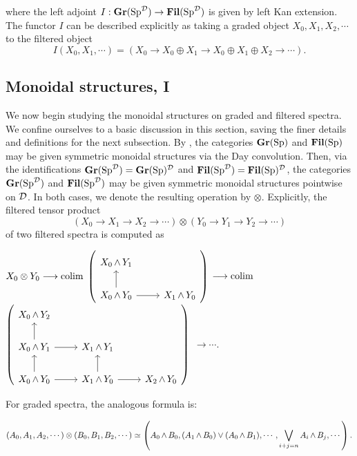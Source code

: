 where the left adjoint $I: \operatorname{\textbf{Gr}}(\operatorname{\text{Sp}}^{\operatorname{\mathcal{D}}}) \to \operatorname{\textbf{Fil}}(\operatorname{\text{Sp}}^{\operatorname{\mathcal{D}}})$ is given by left Kan extension.  The functor $I$ can be described explicitly as taking a graded object $X_0,X_1,X_2,\cdots$ to the filtered object $$I(X_0, X_1, \cdots) = (X_0\to X_0\oplus X_1\to X_0 \oplus X_1\oplus X_2\to \cdots).$$   


\subsection{Monoidal structures, I}\label{sect:monoidal}
We now begin studying the monoidal structures on graded and filtered spectra.  We confine ourselves to a basic discussion in this section, saving the finer details and definitions for the next subsection. 
By \cite[Example 2.2.6.17]{HA}, the categories $\operatorname{\textbf{Gr}}(\operatorname{\text{Sp}})$ and $\operatorname{\textbf{Fil}}(\operatorname{\text{Sp}})$ may be given symmetric monoidal structures via the Day convolution.  Then, via the identifications $\operatorname{\textbf{Gr}}(\operatorname{\text{Sp}}^{\operatorname{\mathcal{D}}}) = \operatorname{\textbf{Gr}}(\operatorname{\text{Sp}})^{\operatorname{\mathcal{D}}}$ and $\operatorname{\textbf{Fil}}(\operatorname{\text{Sp}}^{\operatorname{\mathcal{D}}}) = \operatorname{\textbf{Fil}}(\operatorname{\text{Sp}})^{\operatorname{\mathcal{D}}}$, the categories $\operatorname{\textbf{Gr}}(\operatorname{\text{Sp}}^{\operatorname{\mathcal{D}}})$ and $\operatorname{\textbf{Fil}}(\operatorname{\text{Sp}}^{\operatorname{\mathcal{D}}})$ may be given symmetric monoidal structures pointwise on $\operatorname{\mathcal{D}}$.  In both cases, we denote the resulting operation by $\otimes$.  Explicitly, the filtered tensor product $$\left(X_0 \longrightarrow X_1 \longrightarrow X_2 \longrightarrow \cdots \right) \otimes \left(Y_0 \longrightarrow Y_1 \longrightarrow Y_2 \longrightarrow \cdots \right)$$
of two filtered spectra is computed as

\begin{center}
$X_0 \otimes Y_0 \longrightarrow \operatorname*{\text{colim}} $
{$ \left(\begin{tikzcd} X_0 \smsh Y_1 \\  X_0 \smsh Y_0 \arrow{u} \arrow{r} & X_1 \smsh Y_0 \end{tikzcd} \right) $} 
$\longrightarrow \operatorname*{\text{colim}}$
 {$ \left( \begin{tikzcd} X_0 \smsh Y_2 \\ X_0 \smsh Y_1 \arrow{r} \arrow{u} & X_1 \smsh Y_1  \\ X_0 \smsh Y_0 \arrow{r} \arrow{u} & X_1 \smsh Y_0 \arrow{u} \arrow{r} & X_2 \smsh Y_0 \end{tikzcd} \right) $}
$\longrightarrow \cdots.$
\end{center}

For graded spectra, the analogous formula is:

$$(A_0,A_1,A_2,\cdots) \otimes (B_0,B_1,B_2,\cdots) \simeq \left( A_0 \operatorname{\wedge} B_0, (A_1 \operatorname{\wedge} B_0) \vee (A_0 \operatorname{\wedge} B_1), \cdots, \bigvee_{i+j=n} A_i \operatorname{\wedge} B_j, \cdots \right).$$






